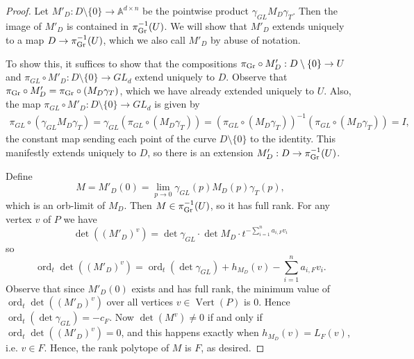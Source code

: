 \documentclass[12pt]{amsart}
\newcommand{\mb}{\mathbb}
\newcommand{\Vt}{{\operatorname{Vert}}}
\theoremstyle{plain}
\theoremstyle{definition}
\theoremstyle{remark}
\begin{document}
\begin{proof}
Let $M'_D : D \setminus \{0\} \to \mb{A}^{d \times n}$ be the pointwise product $\gamma_{GL} M_D \gamma_T$. Then the image of $M'_D$ is contained in $\pi_{{\rm Gr}}^{-1}(U)$. We will show that $M'_D$ extends uniquely to a map $D \to \pi_{{\rm Gr}}^{-1}(U)$, which we also call $M'_D$ by abuse of notation.
\begin{center}
\end{center}
To show this, it suffices to show that the compositions $\pi_{{\rm Gr}} \circ M'_D : D \setminus \{0\} \to U$ and $\pi_{GL} \circ M'_D : D \setminus \{0\} \to GL_d$ extend uniquely to $D$.
Observe that $\pi_{{\rm Gr}} \circ M'_D = \pi_{{\rm Gr}}\circ (M_D\gamma_T)$, which we have already extended uniquely to $U$. Also, the map $\pi_{GL} \circ M'_D : D \setminus \{0\} \to GL_d$ is given by 
\begin{align*}
\pi_{GL} \circ (\gamma_{GL} M_D \gamma_T) 
= \gamma_{GL} (\pi_{GL} \circ (M_D \gamma_T) ) 
= (\pi_{GL} \circ (M_D \gamma_T) )^{-1} (\pi_{GL} \circ (M_D \gamma_T) ) 
= I,
\end{align*}
 the constant map sending each point of the curve $D \setminus \{0\}$ to the identity. This manifestly extends uniquely to $D$, so there is an extension $M'_D: D \to \pi_{{\rm Gr}}^{-1}(U)$.

Define \[M = M'_D(0) = \lim_{p \to 0} \gamma_{GL}(p)M_D(p)\gamma_{T}(p),\] which is an orb-limit of $M_D$. Then $M \in \pi_{{\rm Gr}}^{-1}(U)$, so it has full rank. For any vertex $v$ of $P$ we have
\[
\det((M'_D)^v) = \det \gamma_{GL} \cdot \det M_D \cdot t^{- \sum_{i=1}^n a_{i,F} v_i}
\]
so \[\operatorname{ord}_t \det((M'_D)^v) = \operatorname{ord}_t(\det \gamma_{GL}) + h_{M_D}(v) - \sum_{i=1}^n a_{i,F} v_i.\] Observe that since $M'_D(0)$ exists and has full rank, the minimum value of $\operatorname{ord}_t \det((M'_D)^v)$ over all vertices $v \in \Vt(P)$ is $0$. Hence $\operatorname{ord}_t(\det \gamma_{GL}) = -c_F$. Now $\det(M^v) \neq 0$ if and only if $\operatorname{ord}_t\det((M'_D)^v) = 0$, and this happens exactly when $h_{M_D}(v) = L_F(v)$, i.e. $v \in F$. Hence, the rank polytope of $M$ is $F$, as desired.
\end{proof}
\end{document}
